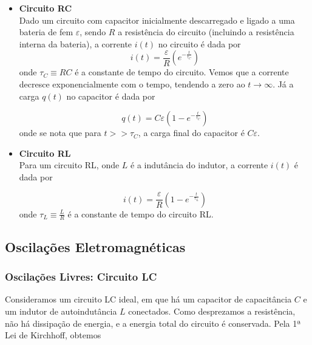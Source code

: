 \documentclass{article}
\begin{document}
\begin{itemize}
    \item [(a)] \textbf{Circuito RC}\\
        Dado um circuito com capacitor inicialmente descarregado e ligado a uma bateria de fem \(\varepsilon\), sendo \(R\) a resistência do circuito (incluindo a resistência interna da bateria), a corrente \(i(t)\) no circuito é dada por
            \begin{equation}
                \boxed{i(t) = \frac{\varepsilon}{R} \left(e^{-\frac{t}{\tau_C}}\right)}
            \end{equation} onde \(\tau_C \equiv RC\) é a constante de tempo do circuito. Vemos que a corrente decresce exponencialmente com o tempo, tendendo a zero ao \(t \to \infty\). Já a carga \(q(t)\) no capacitor é dada por

            \begin{equation}
                \boxed{q(t) = C\varepsilon \left(1 - e^{-\frac{t}{\tau_C}}\right)}
            \end{equation} onde se nota que para \(t >> \tau_C\), a carga final do capacitor é \(C\varepsilon\).

    \item [(b)] \textbf{Circuito RL}\\
        Para um circuito RL, onde \(L\) é a indutância do indutor, a corrente \(i(t)\) é dada por

        \begin{equation}
            \boxed{i(t) = \frac{\varepsilon}{R} \left(1 - e^{-\frac{t}{\tau_L}}\right)}
        \end{equation} onde \(\displaystyle \tau_L \equiv \frac{L}{R}\) é a constante de tempo do circuito RL.
    \end{itemize}

\subsection{Oscilações Eletromagnéticas}

\subsubsection{Oscilações Livres: Circuito LC}

Consideramos um circuito LC ideal, em que há um capacitor de capacitância \(C\) e um indutor de autoindutância \(L\) conectados. Como desprezamos a resistência, não há dissipação de energia, e a energia total do circuito é conservada. Pela 1ª Lei de Kirchhoff, obtemos
\end{document}
